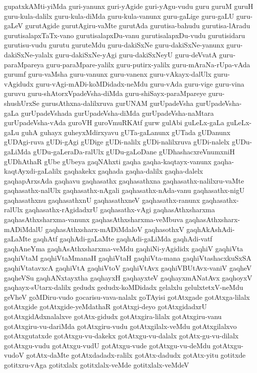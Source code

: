 {gupatxkAMti-yiMda
guri-yanunx
guri-yAgide
guri-yAgu-vudu
guru
guruM
guruH
guru-kula-dalilx
guru-kula-diMda
guru-kula-vanunx
guru-gaLige
guru-gaLU
guru-gaLeV
gurutAgide
gurutAgiru-vaMte
gurutAda
gurutisa-bahudu
gurutisa-lAradu
gurutisalapxTaTx-vano
gurutisalapxDu-vanu
gurutisalapxDu-vudu
gurutisidaru
gurutisu-vudu
gurutu
guruteMdu
guru-dakiSxNe
guru-dakiSxNe-yanunx
guru-dakiSxNe-yalalx
guru-dakiSxNe-yAgi
guru-dakiSxNeyU
guru-deVvatA
guru-paraMpareya
guru-paraMpare-yalilx
guru-putirx-yalilx
guru-mAraNa-rUpa-vAda
gurumf
guru-vaMsha
guru-vanunx
guru-vanenx
guru-vAkayx-dalUlx
guru-vAgidudx
guru-vAgi-mADi-koMDidadx-neMdu
guru-vAda
guru-vige
guru-vina
guruvu
guru-shAtorxVpadeVsha-diMda
guru-shiSayx-paraMpareye
guru-shushUrxSe
gurusAthxna-dalilxruva
gurUNAM
gurUpadeVsha
gurUpadeVsha-gaLa
gurUpadeVshada
gurUpadeVsha-diMda
gurUpadeVsha-naMtara
gurUpadeVsha-vAda
guroVH
guroVmuRKAtf
gurw
gulAbi
guLeLx-gaLa
guLeLx-gaLu
guhA
guhayx
guheyxMdirxyavu
gUTa-gaLanunx
gUTada
gUDanunx
gUDAgi-ruva
gUDi-gAgi
gUDige
gUDi-nalilx
gUDi-nalilxruva
gUDi-nalelx
gUDu-gaLiMda
gUDu-gaLeraDa-ralUlx
gUDu-gaLoDane
gUDhashacxreVnumxniH
gUDhAthaR
gUbe
gUbeya
gaqNAhxti
gaqha
gaqha-kaqtayx-vanunx
gaqha-kaqtAyxdi-gaLalilx
gaqhakekx
gaqhada
gaqha-dalilx
gaqha-dalelx
gaqhapArxsAda
gaqhavu
gaqhasathx
gaqhasathxna
gaqhasathx-nalilxru-vaMte
gaqhasathx-nalUlx
gaqhasathx-nAgali
gaqhasathx-nAda-vanu
gaqhasathx-nigU
gaqhasathxnu
gaqhasathxnU
gaqhasathxneV
gaqhasathx-ranunx
gaqhasathx-ralUlx
gaqhasathx-rAgidadxrU
gaqhasathx-vAgi
gaqhasAthxsharxma
gaqhasAthxsharxma-vanunx
gaqhasAthxsharxma-veMbuva
gaqhasAthxsharx-mADiMdalU
gaqhasAthxsharx-mADiMdaloV
gaqhasothxV
gaqhAkAshAdi-gaLaMte
gaqhAtf
gaqhAdi-gaLaMte
gaqhAdi-gaLiMda
gaqhAdi-vatf
gaqhAneYma
gaqhAsAthxsharxma-veMdu
gaqhiNi-yAgididx
gaqhiV
gaqhiVta
gaqhiVtaM
gaqhiVtaMmanaH
gaqhiVtaH
gaqhiVta-mana
gaqhiVtashacxkuSxSA
gaqhiVtatavxcA
gaqhiVtA
gaqhiVtoV
gaqhiVtAvx
gaqhiVBUtAvx-vaniV
gaqheV
gaqheVSu
gaqhANxtayxtha
gaqhayxH
gaqhayxteV
gaqhayxmANatAvx
gaqhoyxV
gaqhayx-sUtarx-dalilx
gedudx
gedudx-koMDidadx
gelalxlu
gelulxtetxV-neMdu
geVheV
goMDiru-vudo
gocarisu-vava-nalalx
goTAyisi
gotAtxgade
gotAtxga-lilalx
gotAtxgide
gotAtxgide-yeMdathaR
gotAtxgi-deyo
gotAtxgidadxrU
gotAtxgidAdxnalalxve
gotAtx-gidudx
gotAtxgira-lilalx
gotAtxgiru-vanu
gotAtxgiru-vu-dariMda
gotAtxgiru-vudu
gotAtxgilalx-veMdu
gotAtxgilalxvo
gotAtxgutatxde
gotAtxgu-vu-dakekx
gotAtxgu-vu-dalalx
gotAtx-gu-vu-dilalx
gotAtxgu-vudu
gotAtxgu-vudU
gotAtxgu-vude
gotAtxgu-vu-deMdu
gotAtxgu-vudoV
gotAtx-daMte
gotAtxdadadx-ralilx
gotAtx-dadudx
gotAtx-yitu
gotitxde
gotitxru-vAga
gotitxlalx
gotitxlalx-veMde
gotitxlalx-veMdeV
}
